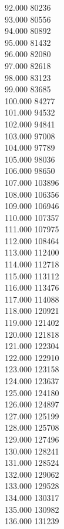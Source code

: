 { 92.000	80236 \\
 93.000	80556 \\
 94.000	80892 \\
 95.000	81432 \\
 96.000	82080 \\
 97.000	82618 \\
 98.000	83123 \\
 99.000	83685 \\
 100.000	84277 \\
 101.000	94532 \\
 102.000	94841 \\
 103.000	97008 \\
 104.000	97789 \\
 105.000	98036 \\
 106.000	98650 \\
 107.000	103896 \\
 108.000	106356 \\
 109.000	106946 \\
 110.000	107357 \\
 111.000	107975 \\
 112.000	108464 \\
 113.000	112400 \\
 114.000	112718 \\
 115.000	113112 \\
 116.000	113476 \\
 117.000	114088 \\
 118.000	120921 \\
 119.000	121402 \\
 120.000	121818 \\
 121.000	122304 \\
 122.000	122910 \\
 123.000	123158 \\
 124.000	123637 \\
 125.000	124180 \\
 126.000	124897 \\
 127.000	125199 \\
 128.000	125708 \\
 129.000	127496 \\
 130.000	128241 \\
 131.000	128524 \\
 132.000	129062 \\
 133.000	129528 \\
 134.000	130317 \\
 135.000	130982 \\
 136.000	131239 \\
}

